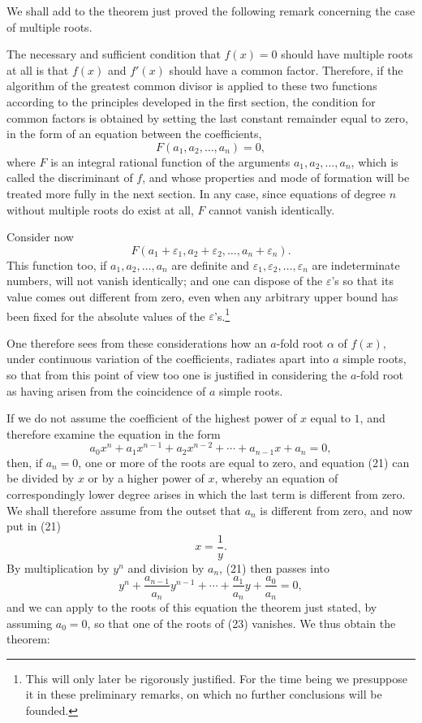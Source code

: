 \documentclass[11pt]{article}
\begin{document}
We shall add to the theorem just proved the following remark concerning the case of multiple roots.

The necessary and sufficient condition that $f(x)=0$ should have multiple roots at all is that $f(x)$ and $f'(x)$ should have a common factor. Therefore, if the algorithm of the greatest common divisor is applied to these two functions according to the principles developed in the first section, the condition for common factors is obtained by setting the last constant remainder equal to zero, in the form of an equation between the coefficients,
\[
 F(a_1,a_2,\ldots,a_n)=0,
\]
where $F$ is an integral rational function of the arguments $a_1,a_2,
\ldots,a_n$, which is called the discriminant of $f$, and whose properties and mode of formation will be treated more fully in the next section. In any case, since equations of degree $n$ without multiple roots do exist at all, $F$ cannot vanish identically.

Consider now
\[
 F(a_1+\varepsilon_1,a_2+\varepsilon_2,
\ldots,a_n+\varepsilon_n).
\]
This function too, if $a_1,a_2,
\ldots,a_n$ are definite and $\varepsilon_1,\varepsilon_2,
\ldots,\varepsilon_n$ are indeterminate numbers, will not vanish identically; and one can dispose of the $\varepsilon$'s so that its value comes out different from zero, even when any arbitrary upper bound has been fixed for the absolute values of the $\varepsilon$'s.\footnote{This will only later be rigorously justified. For the time being we presuppose it in these preliminary remarks, on which no further conclusions will be founded.}

One therefore sees from these considerations how an $a$-fold root $\alpha$ of $f(x)$, under continuous variation of the coefficients, radiates apart into $a$ simple roots, so that from this point of view too one is justified in considering the $a$-fold root as having arisen from the coincidence of $a$ simple roots.

If we do not assume the coefficient of the highest power of $x$ equal to $1$, and therefore examine the equation in the form
\begin{equation}
 a_0x^n+a_1x^{n-1}+a_2x^{n-2}+\cdots+a_{n-1}x+a_n=0,
\tag{21}
\end{equation}
then, if $a_n=0$, one or more of the roots are equal to zero, and equation (21) can be divided by $x$ or by a higher power of $x$, whereby an equation of correspondingly lower degree arises in which the last term is different from zero. We shall therefore assume from the outset that $a_n$ is different from zero, and now put in (21)
\begin{equation}
 x=\frac1y.
\tag{22}
\end{equation}
By multiplication by $y^n$ and division by $a_n$, (21) then passes into
\begin{equation}
 y^n+\frac{a_{n-1}}{a_n}y^{n-1}+\cdots+\frac{a_1}{a_n}y+\frac{a_0}{a_n}=0,
\tag{23}
\end{equation}
and we can apply to the roots of this equation the theorem just stated, by assuming $a_0=0$, so that one of the roots of (23) vanishes. We thus obtain the theorem:
\end{document}
